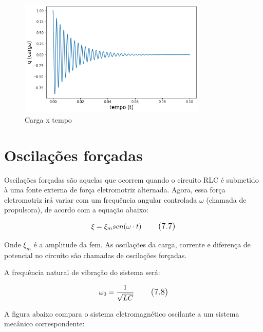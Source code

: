 \begin{figure}[H]
	\centering
	\includegraphics[width=0.8\textwidth]{./Imagens/RLC/rlc2.png} 
	\caption{Carga x tempo}
	\label{fig:RLC2}
\end{figure}

\section{Oscilações forçadas}

Oscilações forçadas são aquelas que ocorrem quando o circuito RLC é submetido à uma fonte externa de força eletromotriz alternada. Agora, essa força eletromotriz irá variar com um frequência angular controlada $\omega$ (chamada de propulsora), de acordo com a equação abaixo:

\begin{equation}
\large \xi = \xi _{m}sen(\omega \cdot t)
\tag{7.7}
\end{equation}

Onde $\xi_{m}$ é a amplitude da fem. As oscilações da carga, corrente e diferença de potencial no circuito são chamadas de oscilações forçadas.

A frequência natural de vibração do sistema será:

\begin{equation}
\large \omega_{0} = \frac{1}{\sqrt{LC}}
\tag{7.8}
\end{equation}

A figura abaixo compara o sistema eletromagnético oscilante a um sistema mecânico correspondente:

